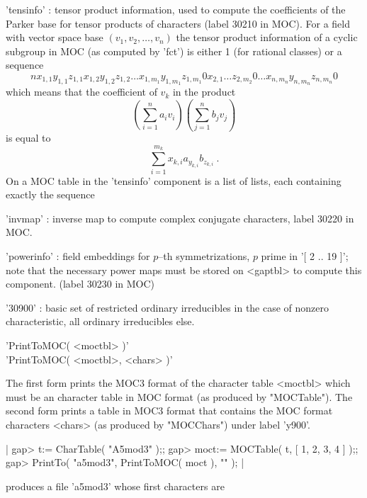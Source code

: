 'tensinfo'    : tensor product information, used to compute the
                coefficients of the Parker base for tensor products
                of characters (label 30210 in MOC).
                For a field with vector space base $(v_1,v_2,\ldots,v_n)$
                the tensor product information of a cyclic subgroup
                in MOC (as computed by 'fct') is either 1 (for rational
                classes) or a sequence
                \[ n x_{1,1} y_{1,1} z_{1,1} x_{1,2} y_{1,2} z_{1,2}
                   \ldots x_{1,m_1} y_{1,m_1} z_{1,m_1} 0 x_{2,1} \ldots
                   z_{2,m_2} 0 \ldots x_{n,m_n} y_{n,m_n} z_{n,m_n} 0 \]
                which means that the coefficient of $v_k$ in the product
                \[ ( \sum_{i=1}^{n} a_i v_i ) ( \sum_{j=1}^{n} b_j v_j ) \]
                is equal to
                \[ \sum_{i=1}^{m_k} x_{k,i} a_{y_{k,i}} b_{z_{k,i}}\ . \]
                On a MOC table in {\GAP} the 'tensinfo' component is
                a list of lists, each containing exactly the sequence

'invmap'      : inverse map to compute complex conjugate characters,
                label 30220 in MOC.

'powerinfo'   : field embeddings for $p$--th symmetrizations, $p$ prime
                in '[ 2 .. 19 ]'; note that the necessary power maps
                must be stored on <gaptbl> to compute this component.
                (label 30230 in MOC)

'30900'       : basic set of restricted ordinary irreducibles in the
                case of nonzero characteristic, all ordinary irreducibles
                else.

%

'PrintToMOC( <moctbl> )'\\
'PrintToMOC( <moctbl>, <chars> )'

The first form prints the MOC3 format of the character table <moctbl>
which must be an character table in MOC format (as produced by
"MOCTable").  The second form prints a table in MOC3 format that
contains the MOC format characters <chars> (as produced by "MOCChars")
under label 'y900'.

|    gap> t:= CharTable( "A5mod3" );;
    gap> moct:= MOCTable( t, [ 1, 2, 3, 4 ] );;
    gap> PrintTo( "a5mod3", PrintToMOC( moct ), "\n" ); |

produces a file 'a5mod3' whose first characters are

